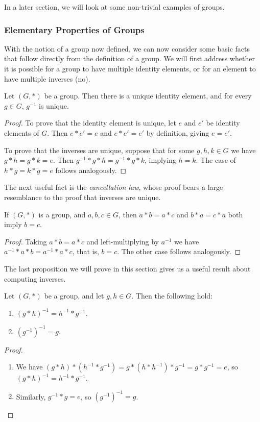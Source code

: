 \documentclass[a4paper]{scrartcl}
\newcommand{\newsubsection}{\subsubsection}
\begin{document}
 In a later section, we will look at some non-trivial examples of groups.

\newsubsection{Elementary Properties of Groups}

With the notion of a group now defined, we can now consider some basic facts that follow directly from the definition of a group. We will first address whether it is possible for a group to have multiple identity elements, or for an element to have multiple inverses (no).

\begin{proposition}
	Let $(G, *)$ be a group. Then there is a unique identity element, and for every $g \in G$, $g^{-1}$ is unique.
\end{proposition}
\begin{proof}
	To prove that the identity element is unique, let $e$ and $e'$ be identity elements of $G$. Then $e* e' = e$ and $e* e' = e'$ by definition, giving $e = e'$. 
	
	To prove that the inverses are unique, suppose that for some $g, h, k \in G$ we have $g* h = g *k = e$. Then $g^{-1}* g *h = g^{-1} *g * k$, implying $h = k$. The case of $h * g = k * g = e$ follows analogously.
\end{proof}

The next useful fact is the \emph{cancellation law}, whose proof bears a large resemblance to the proof that inverses are unique.

\begin{proposition}
	If $(G, *)$ is a group, and $a, b, c \in G$, then $a*b = a*c$ and $b*a = c*a$ both imply $b = c$.
\end{proposition}
\begin{proof}
	Taking $a * b = a * c$ and left-multiplying by $a^{-1}$ we have $a^{-1} * a * b = a^{-1} * a * c$, that is, $b = c$. The other case follows analogously.
\end{proof}

The last proposition we will prove in this section gives us a useful result about computing inverses.

\begin{proposition}
	Let $(G, *)$ be a group, and let $g, h \in G$. Then the following hold:
	\begin{enumerate}[label=(\roman*)]
		\item $(g*h)^{-1} = h^{-1} * g^{-1}$.
		\item $(g^{-1})^{-1} = g$.
	\end{enumerate}
\end{proposition}
\begin{proof}$ $\phantom{\qedhere}
	\begin{enumerate}[label=(\roman*)]
		\item We have $(g*h) * (h^{-1} * g^{-1}) =  g * (h * h^{-1}) * g^{-1} = g * g^{-1} = e$, so $(g*h)^{-1} = h^{-1} * g^{-1}$.
		\item Similarly, $g^{-1} * g = e$, so $(g^{-1})^{-1} = g$. \hfill \qedsymbol
	\end{enumerate}
\end{proof}
\end{document}
